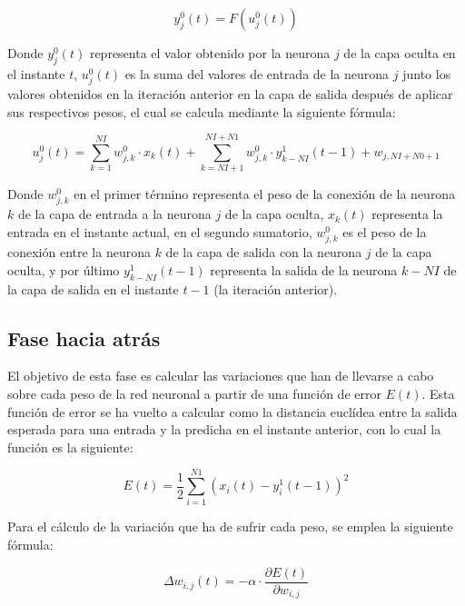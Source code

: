 \documentclass[a4paper,11pt]{article}
\begin{document}
\begin{equation}
	y_{j}^{0}(t) = F\left(u_{j}^{0}(t)\right)
\end{equation}

Donde ${y_{j}^{0}(t)}$ representa el valor obtenido por la neurona ${j}$ de la capa oculta en el instante ${t}$, ${u_{j}^{0}(t)}$ es la suma del valores de entrada de la neurona ${j}$ junto los valores obtenidos en la iteración anterior en la capa de salida después de aplicar sus respectivos pesos, el cual se calcula mediante la siguiente fórmula:

\begin{equation}
	\label{jordan_oculta_u}
	u_{j}^{0}(t) = \sum_{k=1}^{NI}w_{j,k}^{0} \cdot x_{k}(t) + \sum_{k=NI+1}^{NI+N1}{w_{j,k}^{0} \cdot y_{k-NI}^{1}(t-1)} + w_{j,NI+N0+1}
\end{equation}

Donde ${w_{j,k}^{0}}$ en el primer término representa el peso de la conexión de la neurona ${k}$ de la capa de entrada a la neurona ${j}$ de la capa oculta, ${x_{k}(t)}$ representa la entrada en el instante actual, en el segundo sumatorio, ${w_{j,k}^{0}}$ es el peso de la conexión entre la neurona ${k}$ de la capa de salida con la neurona ${j}$ de la capa oculta, y por último ${y_{k-NI}^{1}(t-1)}$ representa la salida de la neurona ${k-NI}$ de la capa de salida en el instante ${t-1}$ (la iteración anterior).

\subsection{Fase hacia atrás}
El objetivo de esta fase es calcular las variaciones que han de llevarse a cabo sobre cada peso de la red neuronal a partir de una función de error ${E(t)}$. Esta función de error se ha vuelto a calcular como la distancia euclídea entre la salida esperada para una entrada y la predicha en el instante anterior, con lo cual la función es la siguiente:

\begin{equation}
	E(t) = \frac{1}{2}\sum_{i=1}^{N1}\left(x_{i}(t) - y_{i}^{1}(t-1)\right)^{2}
\end{equation}

Para el cálculo de la variación que ha de sufrir cada peso, se emplea la siguiente fórmula: 

\begin{equation}
	\label{jordan_variacion_delta}
	\Delta w_{i,j}(t) = -\alpha \cdot \frac{\partial E(t)}{\partial w_{i,j}}
\end{equation}
\end{document}
